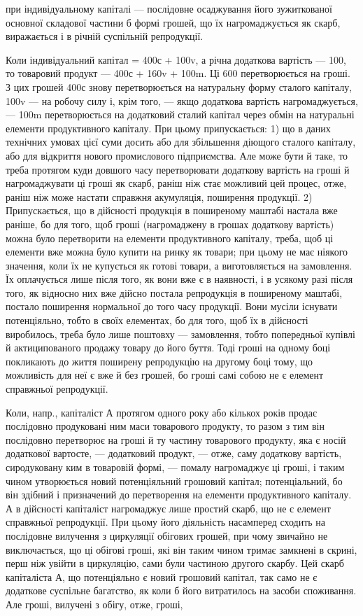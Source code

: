 \parcont{}  %
при індивідуальному капіталі — послідовне осаджування його зужиткованої основної складової частини б
формі грошей, що їх нагромаджується як скарб, виражається і в річній суспільній репродукції.

Коли індивідуальний капітал = 400с + 100v, а річна додаткова вартість — 100, то товаровий продукт —
400с + 160v + 100m. Ці 600 перетворюється на гроші. З цих грошей 400с знову перетворюється на
натуральну форму сталого капіталу, 100v — на робочу силу і, крім того, — якщо додаткова вартість
нагромаджується, — 100m перетворюється на додатковий сталий капітал через обмін на натуральні
елементи продуктивного капіталу. При цьому припускається: 1) що в даних технічних умовах цієї суми
досить або для збільшення діющого сталого капіталу, або для відкриття нового промислового
підприємства. Але може бути й таке, то треба протягом куди довшого часу перетворювати додаткову
вартість на гроші й нагромаджувати ці гроші як скарб, раніш ніж стає можливий цей процес, отже,
раніш ніж може настати справжня акумуляція, поширення продукції. 2) Припускається, що в дійсності
продукція в поширеному маштабі настала вже раніше, бо для того, щоб гроші (нагромаджену в грошах
додаткову вартість) можна було перетворити на елементи продуктивного капіталу, треба, щоб ці
елементи вже можна було купити на ринку як товари; при цьому не має ніякого значення, коли їх не
купується як готові товари, а виготовляється на замовлення. Їх оплачується лише після того, як вони
вже є в наявності, і в усякому разі після того, як відносно них вже дійсно постала репродукція в
поширеному маштабі, постало поширення нормальної до того часу продукції. Вони мусіли існувати
потенціяльно, тобто в своїх елементах, бо для того, щоб їх в дійсності виробилось, треба було лише
поштовху — замовлення, тобто попередньої купівлі й актиципованого продажу товару до його буття. Тоді
гроші на одному боці покликають до життя поширену репродукцію на другому боці тому, що можливість
для неї є вже й без грошей, бо гроші самі собою не є елемент справжньої репродукції.

Коли, напр., капіталіст А протягом одного року або кількох років продає послідовно продуковані ним
маси товарового продукту, то разом з тим він послідовно перетворює на гроші й ту частину товарового
продукту, яка є носій додаткової вартосте, — додатковий продукт, — отже, саму додаткову вартість,
сиродуковану ким в товаровій формі, — помалу нагромаджує ці гроші, і таким чином утворюється новий
потенціяльний грошовий капітал; потенціальний, бо він здібний і призначений до перетворення на
елементи продуктивного капіталу. А в дійсності капіталіст нагромаджує лише простий скарб, що не є
елемент справжньої репродукції. При цьому його діяльність насамперед сходить на послідовне вилучення
з циркуляції обігових грошей, при чому звичайно не виключається, що ці обігові гроші, які він таким
чином тримає замкнені в скрині, перш ніж увійти в циркуляцію, сами були частиною другого скарбу. Цей
скарб капіталіста А, що потенціяльно є новий грошовий капітал, так само не є додаткове суспільне
багатство, як коли б його витратилось на засоби споживання. Але гроші, вилучені з обігу, отже,
гроші,
\parbreak{}  %
